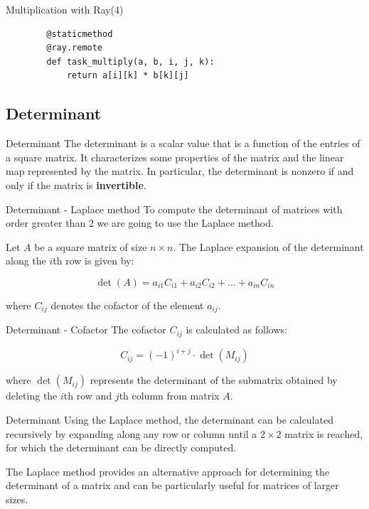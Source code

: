 \documentclass{beamer}
\begin{document}
\begin{frame}[fragile]{Multiplication with Ray(4)}
    \begin{verbatim}
        @staticmethod
        @ray.remote
        def task_multiply(a, b, i, j, k):
            return a[i][k] * b[k][j]
    \end{verbatim}
\end{frame}

\subsection{Determinant}
\begin{frame}{Determinant}
    The \alert{determinant} is a scalar value that is a function of the entries of a square matrix. It characterizes some properties of the matrix and the linear map represented by the matrix. In particular, the determinant is nonzero if and only if the matrix is \textbf{invertible}.

\end{frame}

\begin{frame}{Determinant - Laplace method}
    To compute the determinant of matrices with order greater than 2 we are going to use the \alert{Laplace method}.


    Let $A$ be a square matrix of size $n \times n$. The Laplace expansion of the determinant along the $i$th row is given by:

    $$
        \det(A) = a_{i1} C_{i1} + a_{i2} C_{i2} + \ldots + a_{in} C_{in}
    $$

    where $C_{ij}$ denotes the cofactor of the element $a_{ij}$.
\end{frame}

\begin{frame}{Determinant - Cofactor}
    The \alert{cofactor} $C_{ij}$ is calculated as follows:

    $$
        C_{ij} = (-1)^{i+j} \cdot \det(M_{ij})
    $$

    where $\det(M_{ij})$ represents the determinant of the submatrix obtained by deleting the $i$th row and $j$th column from matrix $A$.
\end{frame}

\begin{frame}{Determinant}
    Using the Laplace method, the determinant can be calculated recursively by expanding along any row or column until a $2 \times 2$ matrix is reached, for which the determinant can be directly computed.

    The Laplace method provides an alternative approach for determining the determinant of a matrix and can be particularly useful for matrices of larger sizes.
\end{frame}
\end{document}
